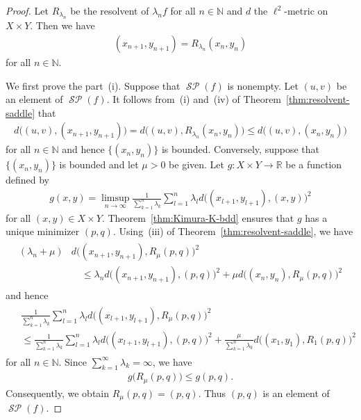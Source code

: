 \documentclass[draft]{amsart}
\numberwithin{equation}{section}
\def\N{\mathbb N}
\def\R{\mathbb R}
\DeclareMathOperator{\Saddle}{\mathcal{SP}}
\theoremstyle{plain}
\theoremstyle{definition}
\theoremstyle{remark}
\begin{document}
\begin{proof}
 Let $R_{\lambda_n}$ be the resolvent of $\lambda_n f$ 
 for all $n\in \N$ and $d$ the $\ell^2$-metric on $X\times Y$. 
 Then we have 
 \begin{align}
  (x_{n+1},y_{n+1})=R_{\lambda_n}(x_n,y_n)				  
 \end{align}
 for all $n\in \N$. 

 We first prove the part~(i). 
 Suppose that $\Saddle (f)$ is nonempty. 
 Let $(u,v)$ be an element of $\Saddle (f)$. 
 It follows from~(i) and~(iv) of Theorem~\ref{thm:resolvent-saddle} that 
 \begin{align}
  d\bigl((u,v), (x_{n+1},y_{n+1})\bigr) 
  =d\bigl((u,v), R_{\lambda_n}(x_{n},y_{n})\bigr) 
  \leq d\bigl((u,v), (x_{n},y_{n})\bigr) 
 \end{align}
 for all $n\in \N$ and hence $\{(x_n,y_n)\}$ is bounded. 
 Conversely, suppose that $\{(x_n,y_n)\}$ is bounded 
 and let $\mu>0$ be given. 
 Let $g\colon X\times Y\to \R$ 
 be a function defined by 
 \begin{align}
  g(x,y) = \limsup_{n\to \infty} 
  \frac{1}{\sum_{k=1}^n \lambda_k}
  \sum_{l=1}^n \lambda_l d\bigl((x_{l+1},y_{l+1}), (x,y)\bigr)^2
 \end{align}
 for all $(x,y)\in X\times Y$. 
 Theorem~\ref{thm:Kimura-K-bdd} ensures that $g$ has a unique 
 minimizer $(p,q)$. 
 Using~(iii) of Theorem~\ref{thm:resolvent-saddle}, we have 
 \begin{align}
 \begin{split}
  (\lambda_n+\mu)
  &d\bigl(
  (x_{n+1},y_{n+1}),R_{\mu}(p,q)
  \bigr)^2 \\
  &\quad \leq 
 \lambda_n
  d\bigl(
  (x_{n+1},y_{n+1}),(p,q)
  \bigr)^2
+ \mu 
  d\bigl(
  (x_{n},y_{n}),R_{\mu}(p,q)
  \bigr)^2  
 \end{split}
 \end{align}
 and hence 
 \begin{align}
 \begin{split}
  &\frac{1}{\sum_{k=1}^n\lambda_k}
  \sum_{l=1}^n\lambda_l
  d\bigl(
  (x_{l+1},y_{l+1}),R_{\mu}(p,q)
  \bigr)^2 \\
  &\leq 
  \frac{1}{\sum_{k=1}^n\lambda_k}
  \sum_{l=1}^n\lambda_l
  d\bigl(
  (x_{l+1},y_{l+1}),(p,q)
  \bigr)^2
+ \frac{\mu}{\sum_{k=1}^n\lambda_k}
d\bigl(
  (x_{1},y_{1}),R_{1}(p,q)
  \bigr)^2  
 \end{split}
 \end{align}
 for all $n\in \N$. Since $\sum_{k=1}^{\infty}\lambda_k=\infty$, 
 we have 
 \begin{align}
  g\bigl(R_{\mu}(p,q)\bigr)
  \leq g(p,q).
 \end{align}
 Consequently, we obtain $R_{\mu}(p,q)=(p,q)$. 
 Thus $(p,q)$ is an element of $\Saddle (f)$. 


\end{proof}
\end{document}
